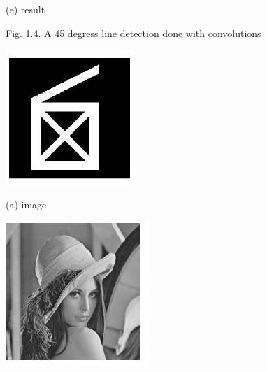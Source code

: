 \documentclass[10pt]{article}
\begin{document}
(e) result

Fig. 1.4. A 45 degress line detection done with convolutions

\includegraphics[max width=\textwidth]{2022_01_06_b5ce182ed1bd5f482e5bg-11(2)}

(a) image

\includegraphics[max width=\textwidth]{2022_01_06_b5ce182ed1bd5f482e5bg-11(3)}
\end{document}
